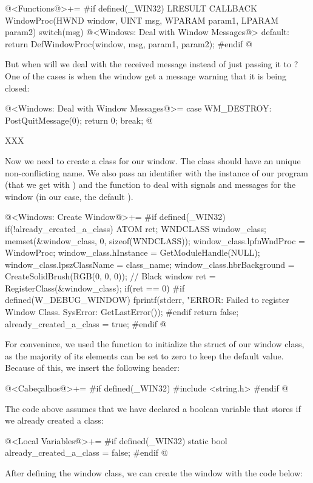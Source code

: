\iniciocodigo
@<Functions@>+=
#if defined(_WIN32)
LRESULT CALLBACK WindowProc(HWND window, UINT msg, WPARAM param1, LPARAM param2){
  switch(msg){
    @<Windows: Deal with Window Messages@>
    default:
      return DefWindowProc(window, msg, param1, param2);
  }
}
#endif
@
\fimcodigo

But when will we deal with the received message instead of just
passing it to ? One of the cases is when the
window get a message warning that it is being closed:

\iniciocodigo
@<Windows: Deal with Window Messages@>=
case WM_DESTROY:
  PostQuitMessage(0);
  return 0;
  break;
@
\fimcodigo


XXX

Now we need to create a class for our window. The class should have an
unique non-conflicting name. We also pass an identifier with the
instance of our program (that we get
with ) and the function to deal with
signals and messages for the window (in our case, the
default ).

\iniciocodigo
@<Windows: Create Window@>+=
#if defined(_WIN32)
if(!already_created_a_class){
  ATOM ret;
  WNDCLASS window_class;
  memset(&window_class, 0, sizeof(WNDCLASS));
  window_class.lpfnWndProc = WindowProc;
  window_class.hInstance = GetModuleHandle(NULL);
  window_class.lpszClassName = class_name;
  window_class.hbrBackground = CreateSolidBrush(RGB(0, 0, 0)); // Black window
  ret = RegisterClass(&window_class);
  if(ret == 0){
#if defined(W_DEBUG_WINDOW)
    fprintf(stderr, "ERROR: Failed to register Window Class. SysError: %
            GetLastError());
#endif
    return false;
  }
  already_created_a_class = true;
}
#endif
@
\fimcodigo

For convenince, we used the function  to initialize
the struct of our window class, as the majority of its elements can be
set to zero to keep the default value. Because of this, we insert the
following header:

\iniciocodigo
@<Cabeçalhos@>+=
#if defined(_WIN32)
#include <string.h>
#endif
@
\fimcodigo

The code above assumes that we have declared a boolean variable that
stores if we already created a class:

\iniciocodigo
@<Local Variables@>+=
#if defined(_WIN32)
static bool already_created_a_class = false;
#endif
@
\fimcodigo

After defining the window class, we can create the window with the
code below:

